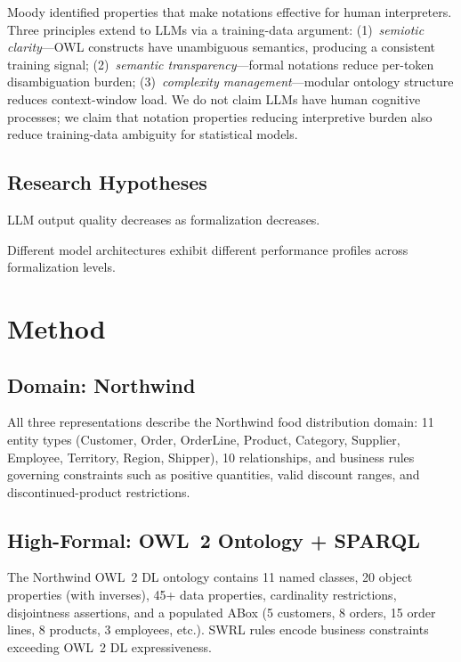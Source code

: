 \documentclass[runningheads]{llncs}
\begin{document}
Moody \cite{moody2009physics} identified properties that make notations effective for human interpreters. Three principles extend to LLMs via a training-data argument: (1)~\emph{semiotic clarity}---OWL constructs have unambiguous semantics, producing a consistent training signal; (2)~\emph{semantic transparency}---formal notations reduce per-token disambiguation burden; (3)~\emph{complexity management}---modular ontology structure reduces context-window load. We do not claim LLMs have human cognitive processes; we claim that notation properties reducing interpretive burden also reduce training-data ambiguity for statistical models.

\subsection{Research Hypotheses}

\begin{description}[noitemsep,style=nextline]
  \item[H1: Quality gradient.] LLM output quality decreases as formalization decreases.
  \item[H2: Model--formalization interaction.] Different model architectures exhibit different performance profiles across formalization levels.
\end{description}

\section{Method}
\label{sec:method}

\subsection{Domain: Northwind}

All three representations describe the Northwind food distribution domain: 11 entity types (Customer, Order, OrderLine, Product, Category, Supplier, Employee, Territory, Region, Shipper), 10 relationships, and business rules governing constraints such as positive quantities, valid discount ranges, and discontinued-product restrictions.

\subsection{High-Formal: OWL~2 Ontology + SPARQL}

The Northwind OWL~2 DL ontology contains 11 named classes, 20 object properties (with inverses), 45+ data properties, cardinality restrictions, disjointness assertions, and a populated ABox (5 customers, 8 orders, 15 order lines, 8 products, 3 employees, etc.). SWRL rules encode business constraints exceeding OWL~2 DL expressiveness.
\end{document}
